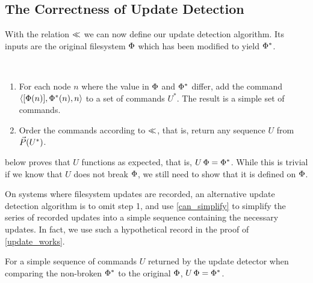 
\subsection{The Correctness of Update Detection}

With the relation $\ll$ we can now define our update detection algorithm.
Its inputs are the original filesystem $\Phi$ which has been modified to yield $\Phi^*$.
\begin{mydef}~
\begin{enumerate}
    \item For each node $n$ where the value in $\Phi$ and $\Phi^*$ differ, add the command $\langle{[\Phi(n)],\Phi^*(n),n}\rangle$ to
        a set of commands $U^*$. The result is a simple set of commands.
    \item Order the commands according to $\ll$, that is, 
        return any sequence $U$ from $\vec{P}({U^*})$. \qedhere
\end{enumerate}
\end{mydef}

 below proves that $U$ functions as expected, that is, $U\,\Phi=\Phi^*$.
While this is trivial if we know that $U$ does not break $\Phi$, we
still need to show that it is defined on $\Phi$.

On systems where filesystem updates are recorded,
an alternative update detection algorithm is to
omit step 1, and use \cref{can_simplify} to simplify the series of recorded updates
into a simple sequence containing the necessary updates.
In fact, we use such a hypothetical record in the proof of \cref{update_works}.


\begin{myth}
For a simple sequence of commands $U$ returned by the update detector
when comparing the non-broken $\Phi^*$ to the original $\Phi$,
$U\,\Phi = \Phi^*$.
\end{myth}


